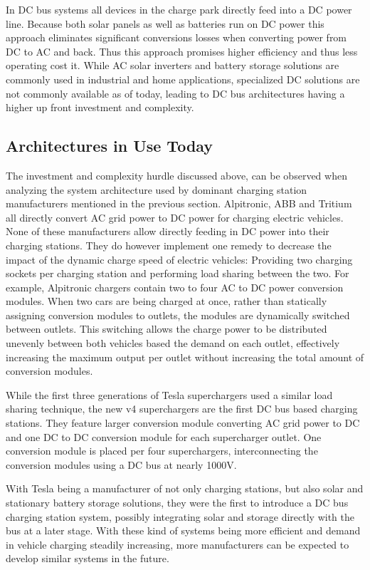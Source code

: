 \documentclass[conference,flushend]{iaria} %
\begin{document}
In DC bus systems all devices in the charge park directly feed into a DC power line. Because both solar panels as well as batteries run on DC power this approach eliminates significant conversions losses when converting power from DC to AC and back.
Thus this approach promises higher efficiency and thus less operating cost it.
While AC solar inverters and battery storage solutions are commonly used in industrial and home applications, specialized DC solutions are not commonly available as of today, leading to DC bus architectures having a higher up front investment and complexity.

\subsection{Architectures in Use Today}
The investment and complexity hurdle discussed above, can be observed when analyzing the system architecture used by dominant charging station manufacturers mentioned in the previous section.
Alpitronic, ABB and Tritium all directly convert AC grid power to DC power for charging electric vehicles.
None of these manufacturers allow directly feeding in DC power into their charging stations.
They do however implement one remedy to decrease the impact of the dynamic charge speed of electric vehicles: Providing two charging sockets per charging station and performing load sharing between the two.
For example, Alpitronic chargers contain two to four AC to DC power conversion modules.
When two cars are being charged at once, rather than statically assigning conversion modules to outlets, the modules are dynamically switched between outlets.
This switching allows the charge power to be distributed unevenly between both vehicles based the demand on each outlet, effectively increasing the maximum output per outlet without increasing the total amount of conversion modules.

While the first three generations of Tesla superchargers used a similar load sharing technique, the new v4 superchargers are the first DC bus based charging stations.
They feature larger conversion module converting AC grid power to DC and one DC to DC conversion module for each supercharger outlet.
One conversion module is placed per four superchargers, interconnecting the conversion modules using a DC bus at nearly 1000V.

With Tesla being a manufacturer of not only charging stations, but also solar and stationary battery storage solutions, they were the first to introduce a DC bus charging station system, possibly integrating solar and storage directly with the bus at a later stage.
With these kind of systems being more efficient and demand in vehicle charging steadily increasing, more manufacturers can be expected to develop similar systems in the future.
\end{document}

